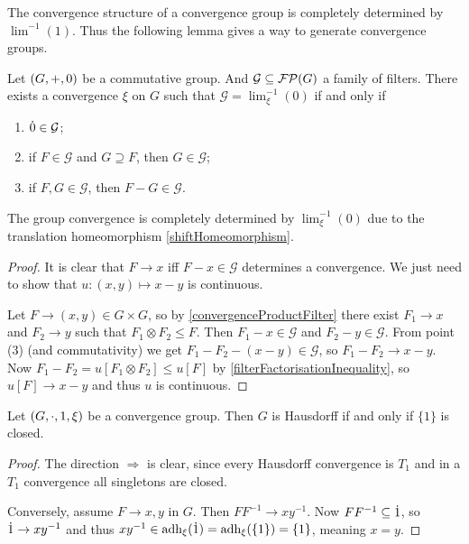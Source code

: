 The convergence structure of a convergence group is completely determined by $\lim^{-1}(1)$. Thus the following lemma gives a way to generate convergence groups.

\begin{proposition} \label{groupConvergenceConstruction}
Let $\left( G, +, 0 \right)$ be a commutative group. And $\mathcal{G} \subseteq \operatorname{\mathcal{FP}}(G)$ a family of filters. There exists a convergence $\xi$ on $G$ such that $\mathcal{G} = \lim^{-1}_\xi(0)$ \textup{if and only if}
\begin{enumerate}
\item $\dot{0} \in \mathcal{G}$;
\item if $F \in \mathcal{G}$ and $G\supseteq F$, then $G\in \mathcal{G}$;
\item if $F,G\in \mathcal{G}$, then $F - G\in \mathcal{G}$.
\end{enumerate}
\end{proposition}
The group convergence is completely determined by $\lim^{-1}_\xi(0)$ due to the translation homeomorphism \ref{shiftHomeomorphism}.
\begin{proof}
It is clear that $F \to x$ iff $F - x \in \mathcal{G}$ determines a convergence. We just need to show that $u: (x,y) \mapsto x - y$ is continuous.

Let $F \to (x,y) \in G\times G$, so by \ref{convergenceProductFilter} there exist $F_1\to x$ and $F_2 \to y$ such that $F_1\otimes F_2 \leq F$. Then $F_1 - x \in \mathcal{G}$ and $F_2 - y \in \mathcal{G}$. From point (3) (and commutativity) we get $F_1 - F_2 - (x - y) \in \mathcal{G}$, so $F_1 - F_2 \to x-y$. Now $F_1 - F_2 = u[F_1\otimes F_2] \leq u[F]$ by \ref{filterFactorisationInequality}, so $u[F] \to x-y$ and thus $u$ is continuous.
\end{proof}

\begin{proposition} \label{HausdorffCriterionConvergenceGroup}
Let $\left( G,\cdot, 1, \xi \right)$ be a convergence group. Then $G$ is Hausdorff \textup{if and only if} $\{1\}$ is closed.
\end{proposition}
\begin{proof}
The direction $\Rightarrow$ is clear, since every Hausdorff convergence is $T_1$ and in a $T_1$ convergence all singletons are closed.

Conversely, assume $F\to x,y$ in $G$. Then $FF^{-1} \to xy^{-1}$. Now $FF^{-1} \subseteq \dot{1}$, so $\dot{1} \to xy^{-1}$ and thus $xy^{-1}\in \operatorname{adh}_\xi(\dot{1}) = \operatorname{adh}_\xi(\{1\}) = \{1\}$, meaning $x = y$.
\end{proof}


